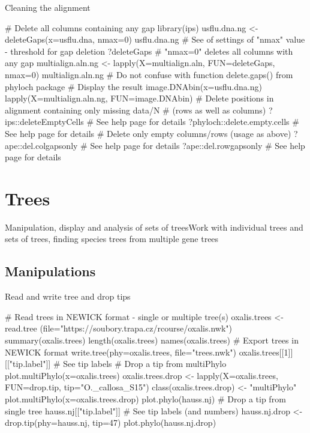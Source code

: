 \documentclass[compress, ucs, xelatex, 11pt, xcolor=svgnames,
	hyperref={
		bookmarks=true,
		unicode=true,
		colorlinks=true,
		pdftitle={Molecular data in R},
		plainpages=false,
		pdfauthor={Vojtech Zeisek},
		pdfsubject={Course about phylogeny and evolution in R},
		pdfcreator={XeLaTeX},
		pdfkeywords={R, evolution, phylogeny, molecular data},
		linkcolor=Tomato,
		anchorcolor=SaddleBrown,
		citecolor=Goldenrod,
		filecolor=DarkMagenta,
		menucolor=Sienna,
		urlcolor=DarkTurquoise,
		pdftex},
	url={hyphens, lowtilde} %
	]{beamer}
\begin{document}
\begin{frame}[fragile]{Cleaning the alignment}
	\begin{spluscode}
    # Delete all columns containing any gap
    library(ips)
    usflu.dna.ng <- deleteGaps(x=usflu.dna, nmax=0)
    usflu.dna.ng
    # See of settings of "nmax" value - threshold for gap deletion
    ?deleteGaps # "nmax=0" deletes all columns with any gap
    multialign.aln.ng <- lapply(X=multialign.aln, FUN=deleteGaps, nmax=0)
    multialign.aln.ng
    # Do not confuse with function delete.gaps() from phyloch package
    # Display the result
    image.DNAbin(x=usflu.dna.ng)
    lapply(X=multialign.aln.ng, FUN=image.DNAbin)
    # Delete positions in alignment containing only missing data/N
    # (rows as well as columns)
    ?ips::deleteEmptyCells # See help page for details
    ?phyloch::delete.empty.cells # See help page for details
    # Delete only empty columns/rows (usage as above)
    ?ape::del.colgapsonly # See help page for details
    ?ape::del.rowgapsonly # See help page for details
	\end{spluscode}
\end{frame}

\section{Trees}

\begin{frame}{Manipulation, display and analysis of sets of trees}{Work with individual trees and sets of trees, finding species trees from multiple gene trees}
	\tableofcontents[currentsection, sectionstyle=show/hide, hideothersubsections]
\end{frame}

\subsection{Manipulations}

\begin{frame}[fragile]{Read and write tree and drop tips}
	\begin{spluscode}
    # Read trees in NEWICK format - single or multiple tree(s)
    oxalis.trees <- read.tree
      (file="https://soubory.trapa.cz/rcourse/oxalis.nwk")
    summary(oxalis.trees)
    length(oxalis.trees)
    names(oxalis.trees)
    # Export trees in NEWICK format
    write.tree(phy=oxalis.trees, file="trees.nwk")
    oxalis.trees[[1]][["tip.label"]] # See tip labels
    # Drop a tip from multiPhylo
    plot.multiPhylo(x=oxalis.trees)
    oxalis.trees.drop <- lapply(X=oxalis.trees, FUN=drop.tip,
      tip="O._callosa_S15")
    class(oxalis.trees.drop) <- "multiPhylo"
    plot.multiPhylo(x=oxalis.trees.drop)
    plot.phylo(hauss.nj) # Drop a tip from single tree
    hauss.nj[["tip.label"]] # See tip labels (and numbers)
    hauss.nj.drop <- drop.tip(phy=hauss.nj, tip=47)
    plot.phylo(hauss.nj.drop)
	\end{spluscode}
\end{frame}
\end{document}
